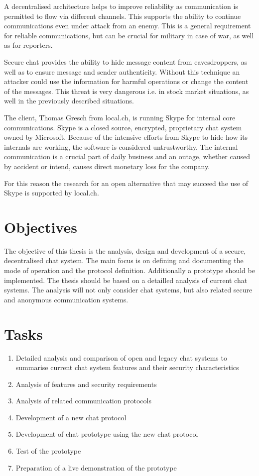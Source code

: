 A decentralised architecture helps to improve reliability as communication is
permitted to flow via different channels. This supports the ability to 
continue communications even under attack from an enemy. This is a general
requirement for reliable communications, but can be crucial for military in
case of war, as well as for reporters.

Secure chat provides the ability to hide message content from eavesdroppers,
as well as to ensure message and sender authenticity.  Without this technique
an attacker could use the information for harmful operations or change the
content of the messages. This threat is very dangerous i.e. in stock market 
situations, as well in the previously described situations.

The client, Thomas Gresch from local.ch, is running Skype for internal core 
communications. Skype is a closed source, encrypted, proprietary chat system 
owned by Microsoft. Because of the intensive efforts from Skype to hide how 
its internals are working, the software is considered untrustworthy.
The internal communication is a crucial part of daily business and an 
outage, whether caused by accident or intend, causes direct monetary 
loss for the company.

For this reason the research for an open alternative that may succeed 
the use of Skype is supported by local.ch.
\section{Objectives}
\label{objectives}
The objective of this thesis is the analysis, design and development of a secure, decentralised chat system. The main focus is on defining and documenting the mode of operation and the protocol definition. Additionally a prototype should be implemented. The thesis should be based on a detailled analysis of current chat systems. The analysis will not only consider chat systems, but also related secure and anonymous communication systems.
\section{Tasks}
\begin{enumerate}
\item Detailed analysis and comparison of open and legacy chat systems to summarise current chat system features and their security characteristics
\item Analysis of features and security requirements
\item Analysis of related communication protocols
\item Development of a new chat protocol
\item Development of chat prototype using the new chat protocol
\item Test of the prototype
\item Preparation of a live demonstration of the prototype
\end{enumerate}
